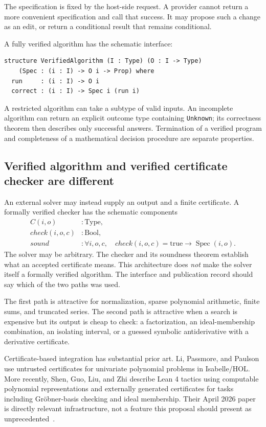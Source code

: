 \documentclass[11pt,letterpaper]{article}
\newcommand{\code}[1]{\nolinkurl{#1}}
\newcommand{\Spec}{\operatorname{Spec}}
\theoremstyle{definition}
\theoremstyle{remark}
\begin{document}
The specification is fixed by the host-side request. A provider cannot return a
more convenient specification and call that success. It may propose such a
change as an edit, or return a conditional result that remains conditional.

A fully verified algorithm has the schematic interface:
\begin{lstlisting}
structure VerifiedAlgorithm (I : Type) (O : I -> Type)
    (Spec : (i : I) -> O i -> Prop) where
  run     : (i : I) -> O i
  correct : (i : I) -> Spec i (run i)
\end{lstlisting}
A restricted algorithm can take a subtype of valid inputs. An incomplete
algorithm can return an explicit outcome type containing \code{Unknown}; its
correctness theorem then describes only successful answers. Termination of a
verified program and completeness of a mathematical decision procedure are
separate properties.

\subsection{Verified algorithm and verified certificate checker are different}
An external solver may instead supply an output and a finite certificate. A
formally verified checker has the schematic components
\[
 \begin{aligned}
 C(i,o)&:\mathrm{Type},\\
 \mathit{check}(i,o,c)&:\mathrm{Bool},\\
 \mathit{sound}&:\forall i,o,c,\quad
      \mathit{check}(i,o,c)=\mathrm{true}\to\Spec(i,o).
 \end{aligned}
\]
The solver may be arbitrary. The checker and its soundness theorem establish
what an accepted certificate means. This architecture does \emph{not} make the
solver itself a formally verified algorithm. The interface and publication
record should say which of the two paths was used.

The first path is attractive for normalization, sparse polynomial arithmetic,
finite sums, and truncated series. The second path is attractive when a search
is expensive but its output is cheap to check: a factorization, an ideal-membership
combination, an isolating interval, or a guessed symbolic antiderivative with
a derivative certificate.

Certificate-based integration has substantial prior art. Li, Passmore, and Paulson use
untrusted certificates for univariate polynomial problems in Isabelle/HOL.
More recently, Shen, Guo, Liu, and Zhi describe Lean 4 tactics using computable
polynomial representations and externally generated certificates for tasks
including Gr\"obner-basis checking and ideal membership. Their April 2026 paper
is directly relevant infrastructure, not a feature this proposal should present
as unprecedented~\cite{li-paulson,polynomial-lean}.
\end{document}
